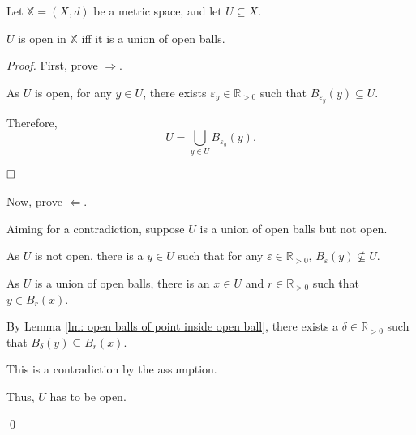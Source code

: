 \begin{theorem}
	\label{thm: set is open iff union of open balls}
	Let $\mathbb X = (X, d)$ be a metric space, and let $U \subseteq X$.
	
	$U$ is open in $\mathbb X$ iff it is a union of open balls.
	
	\begin{proof}
		First, prove $\Rightarrow$.
		
		As $U$ is open, for any $y \in U$, there exists $\varepsilon_y \in \mathbb R_{> 0}$ such that $B_{\varepsilon_y}(y) \subseteq U$.
		
		Therefore,
		$$
		U = \bigcup_{y \in U} B_{\varepsilon_y} (y).
		$$
		
		$\qedlm$
		
		Now, prove $\Leftarrow$.
		
		Aiming for a contradiction, suppose $U$ is a union of open balls but not open.
		
		As $U$ is not open, there is a $y \in U$ such that for any $\varepsilon \in \mathbb R_{> 0}$, $B_\varepsilon (y) \not \subseteq U$.
		
		As $U$ is a union of open balls, there is an $x \in U$ and $r \in \mathbb R_{> 0}$ such that $y \in B_r (x)$.
		
		By Lemma \ref{lm: open balls of point inside open ball}, there exists a $\delta \in \mathbb R_{> 0}$ such that $B_\delta (y) \subseteq B_r (x)$.
		
		This is a contradiction by the assumption.
		
		Thus, $U$ has to be open.
		
		\qed
	\end{proof}
\end{theorem}


